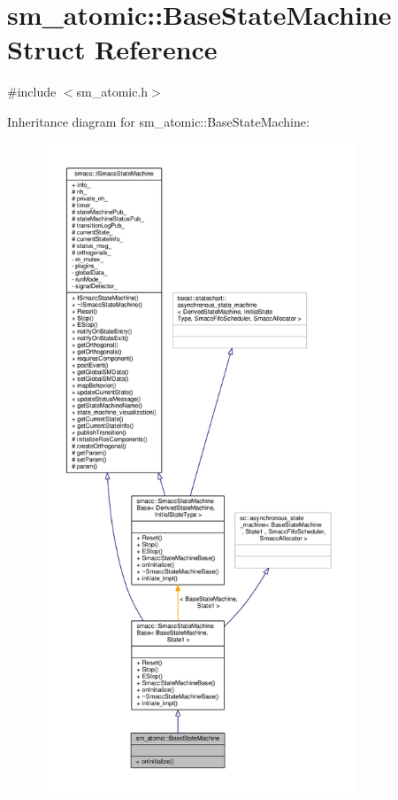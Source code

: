 \hypertarget{structsm__atomic_1_1BaseStateMachine}{}\section{sm\+\_\+atomic\+:\+:Base\+State\+Machine Struct Reference}
\label{structsm__atomic_1_1BaseStateMachine}


{\ttfamily \#include $<$sm\+\_\+atomic.\+h$>$}



Inheritance diagram for sm\+\_\+atomic\+:\+:Base\+State\+Machine\+:
\nopagebreak
\begin{figure}[H]
\begin{center}
\leavevmode
\includegraphics[height=550pt]{structsm__atomic_1_1BaseStateMachine__inherit__graph}
\end{center}
\end{figure}


